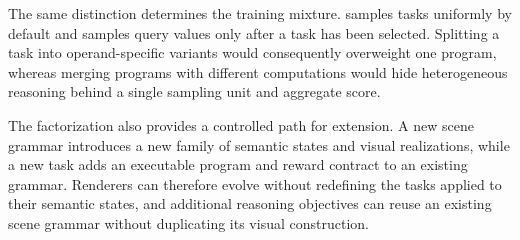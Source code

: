The same distinction determines the training mixture. \trace samples tasks
uniformly by default and samples query values only after a task has been
selected. Splitting a task into operand-specific variants would consequently
overweight one program, whereas merging programs with different computations
would hide heterogeneous reasoning behind a single sampling unit and aggregate
score.

The factorization also provides a controlled path for extension. A new scene
grammar introduces a new family of semantic states and visual realizations,
while a new task adds an executable program and reward contract to an existing
grammar. Renderers can therefore evolve without redefining the tasks applied
to their semantic states, and additional reasoning objectives can reuse an
existing scene grammar without duplicating its visual construction.